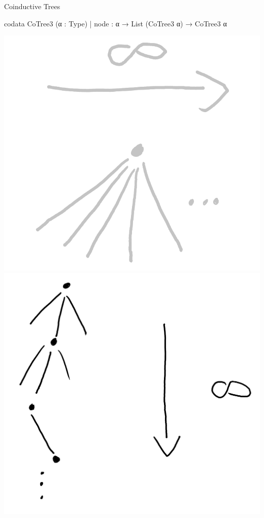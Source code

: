 \documentclass[t,12pt]{beamer}
\begin{document}


\begin{frame}[fragile]{Coinductive Trees}
    \vfill
\begin{leancode}
codata CoTree3 (α : Type)
  | node : α → List (CoTree3 α) → CoTree3 α
\end{leancode}

\medskip

{
    \hfill
    \includegraphics[scale=0.1]{tree_inf_wide_grey.png}
    \hspace*{2.6cm}
    \includegraphics[scale=0.07]{tree_inf_deep.png}    
    \hfill
}



     
\end{frame}
    
\end{document}
